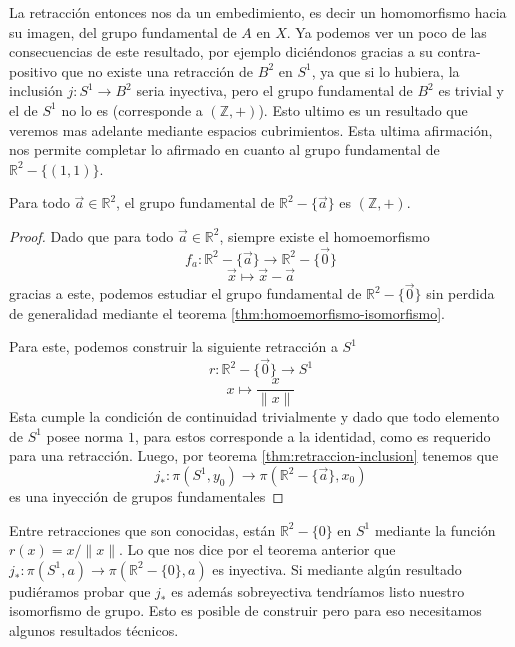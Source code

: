 La retracción entonces nos da un embedimiento, es decir un homomorfismo
hacia su imagen, del grupo fundamental de
\( A \) en \(X\). Ya podemos ver un poco de las consecuencias de este
resultado, por ejemplo diciéndonos gracias a su contra-positivo que no
existe una retracción de \(B^2\) en \(S^1\), ya que si lo hubiera, la
inclusión \(j : S^1 \to B^2\) seria inyectiva, pero el grupo fundamental
de \(B^2\) es trivial y el de \(S^1\) no lo es (corresponde a \((\mathbb
Z, +)\)). Esto ultimo es un resultado que veremos mas adelante
mediante espacios cubrimientos. Esta ultima afirmación, nos permite
completar lo afirmado en cuanto al grupo fundamental de \(\mathbb R ^2 -
\{(1,1)\}\).

\begin{corolario}
  Para todo \(\vec a \in \mathbb R ^2\), el grupo fundamental de \(\mathbb R ^2 - \{\vec a\}\) es \((\mathbb Z, +)\).
\end{corolario}
\begin{proof}
Dado que para todo \(\vec a \in \mathbb R ^2 \), siempre existe
el homoemorfismo
\[ f_a : \mathbb R ^2 - \{\vec a\} \to \mathbb R ^2 - \{\vec 0\} \]
\[ \vec x \mapsto \vec x - \vec a \]
gracias a este, podemos estudiar el grupo fundamental de \(\mathbb R ^2
- \{\vec 0\}\) sin perdida de generalidad mediante el teorema
\ref{thm:homoemorfismo-isomorfismo}.

Para este, podemos construir la siguiente retracción a \(S^1\)
\[ r : \mathbb R ^2 - \{\vec 0\} \to S^1 \]
\[ x \mapsto \frac x {\lVert x \rVert} \]
Esta cumple la condición de continuidad trivialmente y dado que todo
elemento de \(S^1\) posee norma \(1\), para estos corresponde a la
identidad, como es requerido para una retracción. Luego, por teorema
\ref{thm:retraccion-inclusion} tenemos que
\[ j_* : \pi (S^1 , y_0) \to \pi (\mathbb R ^2 - \{\vec a\}, x_0) \]
es una inyección de grupos fundamentales

\end{proof}

Entre retracciones que son conocidas, están \(\mathbb R ^2 - \{0\}\) en
\(S^1\) mediante la función \(r (x) = x / \lVert x \rVert \). Lo que nos
dice por el teorema anterior que \(j_{*} : \pi (S^1, a) \to \pi (\mathbb
R ^2 - \{0\}, a)\) es inyectiva. Si mediante algún resultado pudiéramos
probar que \(j_{*}\) es además sobreyectiva tendríamos listo nuestro
isomorfismo de grupo. Esto es posible de construir pero para eso
necesitamos algunos resultados técnicos.

